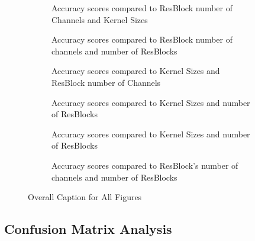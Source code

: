 \documentclass[]{report}
\begin{document}
\begin{figure}
    \centering
    \begin{subfigure}{0.48\linewidth}
        \centering
        
        \caption{Accuracy scores compared to ResBlock number of Channels and  Kernel Sizes }
        \label{fig:BvK}
    \end{subfigure}
    \begin{subfigure}{0.48\linewidth}
        \centering
        
        \caption{Accuracy scores compared to ResBlock number of channels and number of ResBlocks}
        \label{fig:BvN}
    \end{subfigure}

    \begin{subfigure}{0.48\linewidth}
        \centering
        
        \caption{Accuracy scores compared to Kernel Sizes and ResBlock number of Channels}
        \label{fig:KvB}
    \end{subfigure}
    \begin{subfigure}{0.48\linewidth}
        \centering
        
        \caption{Accuracy scores compared to Kernel Sizes and number of ResBlocks}
        \label{fig:KvN}
    \end{subfigure}

    \begin{subfigure}{0.48\linewidth}
        \centering
        
        \caption{Accuracy scores compared to Kernel Sizes and number of ResBlocks}
        \label{fig:NvK}
    \end{subfigure}
    \begin{subfigure}{0.48\linewidth}
        \centering
        
        \caption{Accuracy scores compared to ResBlock's number of channels and number of ResBlocks}
        \label{fig:NvB}
    \end{subfigure}

    \caption{Overall Caption for All Figures}
    \label{fig:overall}
\end{figure}




\subsection{Confusion Matrix Analysis}

\end{document}
